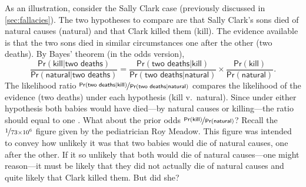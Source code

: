 \documentclass{article}
\newcommand{\pr}{\mathsf{Pr}}
\begin{document}
%


As an illustration, consider the Sally Clark case (previously discussed in \ref{sec:fallacies}). 
The two hypotheses to compare are that Sally Clark's sons 
died of natural causes (\textsf{natural}) and that  Clark killed them (\textsf{kill}). The evidence available is that 
the two sons died in similar circumstances one after the other (\textsf{two deaths}).
By Bayes' theorem (in the odds version),
%
\[
 \frac{\pr(\textsf{kill} \vert \textsf{two deaths})}{\pr(\textsf{natural} \vert \textsf{two deaths})} = 
 \frac{\pr(\textsf{two deaths} \vert \textsf{kill})}{\pr(\textsf{two deaths} \vert \textsf{natural})} 
 \times 
 \frac{\pr(\textsf{kill})}{\pr(\textsf{natural})}.
\]
%
The likelihood ratio $ \nicefrac{\pr(\textsf{two deaths} \vert \textsf{kill})}{\pr(\textsf{two deaths} \vert \textsf{natural})}$ 
compares the likelihood of the evidence (\textsf{two deaths}) under each hypothesis (\textsf{kill} v.\ \textsf{natural}). 
Since under either hypothesis both babies would have died---by 
natural causes or killing---the ratio should equal to one \citep{Dawid02}. %
What about 
the prior odds $\nicefrac{\pr(\textsf{kill})}{\pr(\textsf{natural})}$? 
Recall the $\nicefrac{1}{73\times 10^6}$ figure given by the pediatrician Roy Meadow. This figure was intended to convey how unlikely it was that two babies would die of natural causes, one after the other. If it so unlikely that both would die of natural causes---one might reason---it must be likely that they did not actually die of natural causes and 
quite likely that Clark killed them. But did she? 
\end{document}
